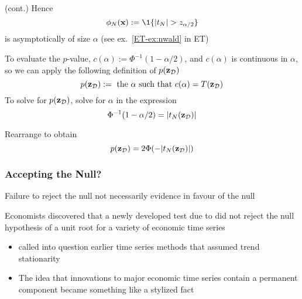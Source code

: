 \begin{frame}
    
    \vspace{2em}
    \Eg (cont.)
    Hence
    \begin{equation*}
        \label{eq:easn3}
        \phi_N(\boldx) := \1 \{ |t_N| > z_{\alpha/2} \}
    \end{equation*}
    is asymptotically of size $\alpha$ (see ex.~\ref{ET-ex:nwald} in ET)
    
    To evaluate the $p$-value, $c(\alpha) := \Phi^{-1}(1 - \alpha / 2)$, 
    and $c(\alpha)$ is continuous in $\alpha$, so we can 
    apply the following definition of $p(\mathbf{z}_{\mathcal D})$
    \begin{equation*}
        p(\mathbf{z}_{\mathcal D}) := \text{ the } \alpha \text{ such that } c(\alpha) =
        T(\mathbf{z}_{\mathcal D}) 
    \end{equation*}
    To solve for $p(\mathbf{z}_{\mathcal D})$, solve
    for $\alpha$ in the expression $$\Phi^{-1}(1 - \alpha/2) =
    |t_N(\mathbf{z}_{\mathcal D})|$$
        
    Rearrange to obtain
    \begin{equation*}
        \label{eq:pvsc}
        p(\mathbf{z}_{\mathcal D}) = 2 \Phi(-|t_N(\mathbf{z}_{\mathcal D})|)
    \end{equation*}    

\end{frame}

\begin{frame}\frametitle{Accepting the Null?}
    
    \vspace{2em}
    Failure to reject the null not necessarily evidence in favour of the null
    
    \vspace{.7em}
    Economists discovered that a newly developed test due to
    \cite{dickey1979distribution} did not reject the null hypothesis of a unit
    root for a variety of economic time series
    \begin{itemize}
        \item called into
        question earlier time series methods that assumed trend
        stationarity
        \item The idea that innovations to major economic time series contain a
        permanent component became something like a stylized fact
    \end{itemize}



\end{frame}

